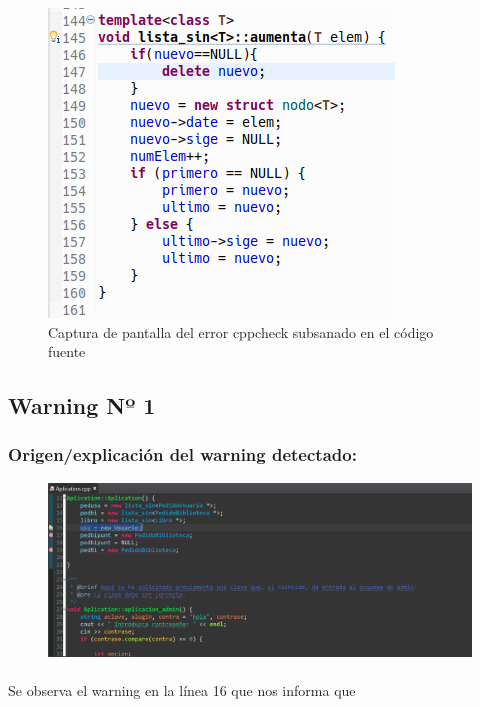 			\begin{figure}[H]
				\centering
				\includegraphics[scale=0.55]{img/captura93.png}
				\caption{Captura de pantalla del error cppcheck subsanado en el código fuente}
				\label{captura9}
			\end{figure}
		
	\subsection{Warning Nº 1}
	
		\subsubsection{Origen/explicación del warning detectado:}
		
			\begin{figure}[H]
				\centering
				\includegraphics[scale=0.55]{img/esteban1.png}
				\label{esteban1}
			\end{figure}
		
			\paragraph{}Se observa el warning en la línea 16 que nos informa que 
			
